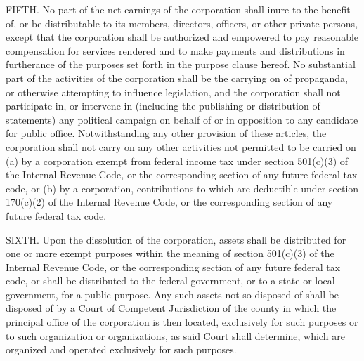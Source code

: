 FIFTH. No part of the net earnings of the corporation shall inure to the benefit of, or be distributable to its members, directors, officers, or other private persons, except that the corporation shall be authorized and empowered to pay reasonable compensation for services rendered and to make payments and distributions in furtherance of the purposes set forth in the purpose clause hereof. No substantial part of the activities of the corporation shall be the carrying on of propaganda, or otherwise attempting to influence legislation, and the corporation shall not participate in, or intervene in (including the publishing or distribution of statements) any political campaign on behalf of or in opposition to any candidate for public office. Notwithstanding any other provision of these articles, the corporation shall not carry on any other activities not permitted to be carried on (a) by a corporation exempt from federal income tax under section 501(c)(3) of the Internal Revenue Code, or the corresponding section of any future federal tax code, or (b) by a corporation, contributions to which are deductible under section 170(c)(2) of the Internal Revenue Code, or the corresponding section of any future federal tax code.

SIXTH. Upon the dissolution of the corporation, assets shall be distributed for one or more exempt purposes within the meaning of section 501(c)(3) of the Internal Revenue Code, or the corresponding section of any future federal tax code, or shall be distributed to the federal government, or to a state or local government, for a public purpose. Any such assets not so disposed of shall be disposed of by a Court of Competent Jurisdiction of the county in which the principal office of the corporation is then located, exclusively for such purposes or to such organization or organizations, as said Court shall determine, which are organized and operated exclusively for such purposes.
    
    
    
    